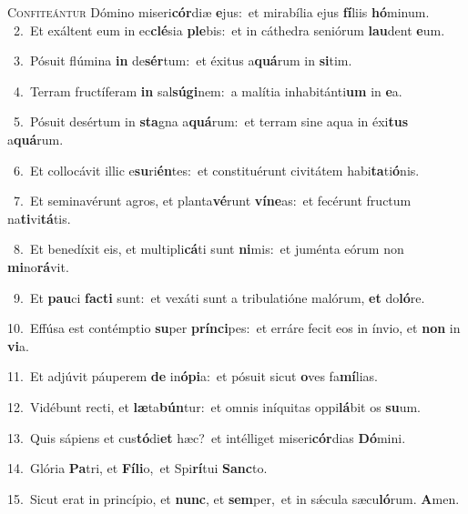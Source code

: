 \lettrine{\initial\textcolor{\initialcolor}{C}}{onfiteántur} Dómino miseri\-\textbf{cór}\-diæ \textbf{e}\-jus:~\star et mirabília ejus \textbf{fí}\-liis \textbf{hó}\-minum.\\
{\numbfont\textcolor{\numbcolor}{~2.}}~Et exáltent eum in ec\-\textbf{clé}\-sia \textbf{ple}\-bis:~\star et in cáthedra seniórum \textbf{lau}\-dent \textbf{e}\-um.\par
{\numbfont\textcolor{\numbcolor}{~3.}}~Pósuit flúmina \textbf{in} de\-\textbf{sér}\-tum:~\star et éxitus a\-\textbf{quá}\-rum in \textbf{si}\-tim.\par
{\numbfont\textcolor{\numbcolor}{~4.}}~Terram fructíferam \textbf{in} sal\-\textbf{sú}\-\textbf{gi}nem:~\star a malítia inhabitánti\textbf{um} in \textbf{e}\-a.\par
{\numbfont\textcolor{\numbcolor}{~5.}}~Pósuit desértum in \textbf{sta}\-gna a\-\textbf{quá}\-rum:~\star et terram sine aqua in éxi\textbf{tus} a\-\textbf{quá}\-rum.\par
{\numbfont\textcolor{\numbcolor}{~6.}}~Et collocávit illic e\-\textbf{su}\-ri\-\textbf{én}\-tes:~\star et constituérunt civitátem habi\-\textbf{ta}\-ti\-\textbf{ó}\-nis.\par
{\numbfont\textcolor{\numbcolor}{~7.}}~Et seminavérunt agros, et planta\-\textbf{vé}\-runt \textbf{ví}\-\textbf{ne}as:~\star et fecérunt fructum na\-\textbf{ti}\-vi\-\textbf{tá}\-tis.\par
{\numbfont\textcolor{\numbcolor}{~8.}}~Et benedíxit eis, et multipli\-\textbf{cá}\-ti sunt \textbf{ni}\-mis:~\star et juménta eórum non \textbf{mi}\-no\-\textbf{rá}\-vit.\par
{\numbfont\textcolor{\numbcolor}{~9.}}~Et \textbf{pau}\-ci \textbf{fac}\-\textbf{ti} sunt:~\star et vexáti sunt a tribulatióne malórum, \textbf{et} do\-\textbf{ló}\-re.\par
{\numbfont\textcolor{\numbcolor}{10.}}~Effúsa est contémptio \textbf{su}\-per \textbf{prín}\-\textbf{ci}pes:~\star et erráre fecit eos in ínvio, et \textbf{non} in \textbf{vi}\-a.\par
{\numbfont\textcolor{\numbcolor}{11.}}~Et adjúvit páuperem \textbf{de} in\-\textbf{ó}\-\textbf{pi}a:~\star et pósuit sicut \textbf{o}\-ves fa\-\textbf{mí}\-lias.\par
{\numbfont\textcolor{\numbcolor}{12.}}~Vidébunt recti, et \textbf{læ}\-ta\-\textbf{bún}\-tur:~\star et omnis iníquitas oppi\-\textbf{lá}\-bit os \textbf{su}\-um.\par
{\numbfont\textcolor{\numbcolor}{13.}}~Quis sápiens et cus\-\textbf{tó}\-di\textbf{et} hæc?~\star et intélliget miseri\-\textbf{cór}\-dias \textbf{Dó}\-mini.\par
{\numbfont\textcolor{\numbcolor}{14.}}~Glória \textbf{Pa}\-tri, et \textbf{Fí}\-\textbf{li}o,~\star et Spi\-\textbf{rí}\-tui \textbf{Sanc}\-to.\par
{\numbfont\textcolor{\numbcolor}{15.}}~Sicut erat in princípio, et \textbf{nunc}\-, et \textbf{sem}\-per,~\star et in sǽcula sæcu\-\textbf{ló}\-rum. \textbf{A}\-men.\par

